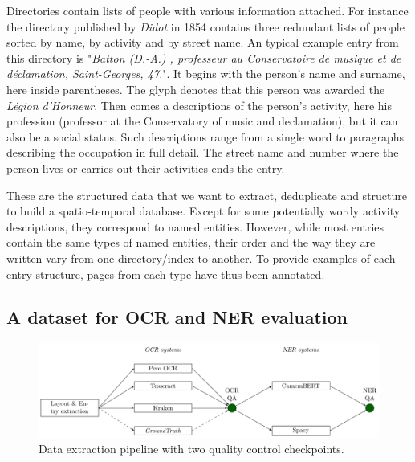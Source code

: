 Directories contain lists of people with various information attached.
For instance the directory published by \emph{Didot} in 1854 contains three redundant lists of people sorted by name, by activity and by street name.
An typical example entry from this directory is "\textit{Batton (D.-A.) , professeur au Conservatoire de musique et de déclamation, Saint-Georges, 47.}".
It begins with the person's name and surname, here inside parentheses.
The glyph denotes that this person was awarded the \textit{Légion d'Honneur}.
Then comes a descriptions of the person's activity, here his profession (professor at the Conservatory of music and declamation), but it can also be a social status.
Such descriptions range from a single word to paragraphs describing the occupation in full detail.
The street name and number where the person lives or carries out their activities ends the entry.

These are the structured data that we want to extract, deduplicate  and structure to build a spatio-temporal database.
Except for some potentially wordy activity descriptions, they correspond to named entities. However, while most entries contain the same types of named entities, their order and the way they are written vary from one directory/index to another. To provide examples of each entry structure, pages from each type have thus been annotated. %


\subsection{A dataset for OCR and NER evaluation}


\begin{figure}[tb]
    \includegraphics[width=\linewidth]{figs/protocol.pdf}
    \caption{Data extraction pipeline with two quality control checkpoints. }
    \label{fig.pipeline}
\end{figure}


